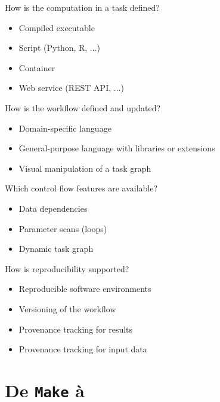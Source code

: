 \documentclass[aspectratio=169]{beamer}
\begin{document}
\begin{frame}{How is the computation in a task defined?}

  \begin{itemize}
  \item Compiled executable
  \item Script (Python, R, ...)
  \item Container
  \item Web service (REST API, ...)
  \end{itemize}

\end{frame}

\begin{frame}{How is the workflow defined and updated?}

  \begin{itemize}
  \item Domain-specific language
  \item General-purpose language with libraries or extensions
  \item Visual manipulation of a task graph
  \end{itemize}

\end{frame}

\begin{frame}{Which control flow features are available?}

  \begin{itemize}
  \item Data dependencies
  \item Parameter scans (loops)
  \item Dynamic task graph
  \end{itemize}

\end{frame}

\begin{frame}{How is reproducibility supported?}

  \begin{itemize}
  \item Reproducible software environments
  \item Versioning of the workflow
  \item Provenance tracking for results
  \item Provenance tracking for input data
  \end{itemize}

\end{frame}

\section*{De \texttt{Make} à }
\end{document}

